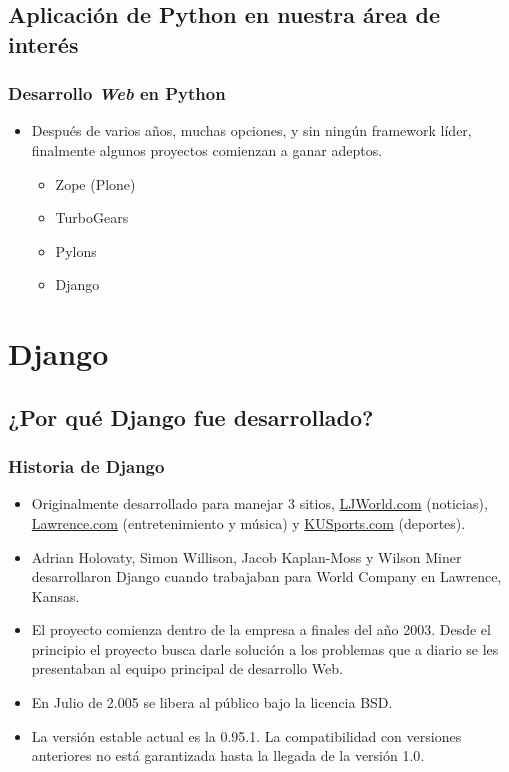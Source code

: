 \documentclass{beamer}
\begin{document}
\subsection{Aplicación de Python en nuestra área de interés}
\begin{frame}
  \frametitle{Desarrollo \emph{Web} en Python}
  \begin{itemize}[<+->]
    \item
      Después de varios años, muchas opciones, y sin ningún framework líder, finalmente algunos proyectos comienzan a ganar adeptos.
      \begin{itemize}
        \item
          Zope (Plone)
        \item
          TurboGears
	\item
	  Pylons
        \item
          \alert{Django}
      \end{itemize}
  \end{itemize}
\end{frame}

\section{Django}
\subsection{¿Por qué Django fue desarrollado?}
\begin{frame}
  \frametitle{Historia de Django}
  \begin{itemize}[<+->]
    \item
      Originalmente desarrollado para manejar 3 sitios,
      \href{http://ljworld.com}{LJWorld.com} (noticias),
      \href{http://lawrence.com}{Lawrence.com} (entretenimiento y
      música) y \href{http://kusports.com}{KUSports.com} (deportes).
    \item
      Adrian Holovaty, Simon Willison, Jacob Kaplan-Moss y Wilson Miner
      desarrollaron \alert{Django} cuando trabajaban para \alert{World
      Company} en Lawrence, Kansas. 
    \item
      El proyecto comienza \alert{dentro} de la empresa a finales del año
      2003. Desde el principio el proyecto busca darle solución a los
      problemas que a diario se les presentaban al equipo principal de
      desarrollo Web.
    \item
      En Julio de 2.005 se libera al público bajo la licencia BSD.
    \item
      La versión estable actual es la \alert{0.95.1}. La compatibilidad
      con versiones anteriores no está garantizada hasta la llegada de
      la versión \alert{1.0}.
  \end{itemize}
\end{frame}
\end{document}
